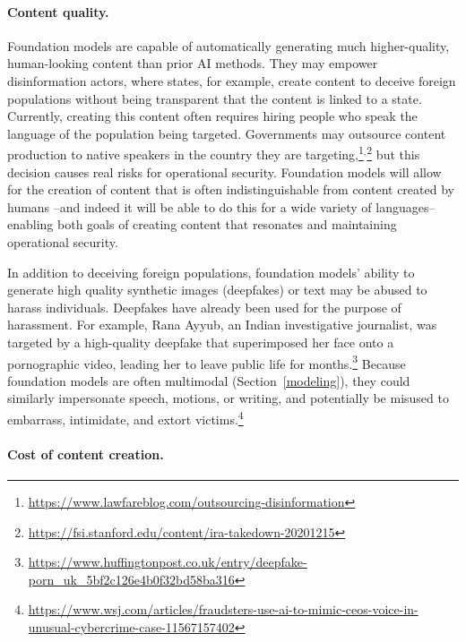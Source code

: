 \paragraph{Content quality.} Foundation models are capable of automatically generating much higher-quality, human-looking content than prior AI methods. They may empower disinformation actors, where states, for example, create content to deceive foreign populations without being transparent that the content is linked to a state. Currently, creating this content often requires hiring people who speak the language of the population being targeted. Governments may outsource content production to native speakers in the country they are targeting,\footnote{\url{https://www.lawfareblog.com/outsourcing-disinformation}}$^{,}$\footnote{ \url{https://fsi.stanford.edu/content/ira-takedown-20201215}} but this decision causes real risks for operational security. Foundation models will allow for the creation of content that is often indistinguishable from content created by humans \citep{kreps_mccain_brundage_2020, clark2021all}--and indeed it will be able to do this for a wide variety of languages--enabling both goals of creating content that resonates and maintaining operational security. 

In addition to deceiving foreign populations, foundation models’ ability to generate high quality synthetic images (deepfakes) or text may be abused to harass individuals. Deepfakes have already been used for the purpose of harassment. For example, Rana Ayyub, an Indian investigative journalist, was targeted by a high-quality deepfake that superimposed her face onto a pornographic video, leading her to leave public life for months.\footnote{\url{ https://www.huffingtonpost.co.uk/entry/deepfake-porn_uk_5bf2c126e4b0f32bd58ba316}} Because foundation models are often multimodal (Section~\ref{modeling}), they could similarly impersonate speech, motions, or writing, and potentially be misused to embarrass, intimidate, and extort victims.\footnote{\href{https://www.wsj.com/articles/fraudsters-use-ai-to-mimic-ceos-voice-in-unusual-cybercrime-case-11567157402}{{ https://www.wsj.com/articles/fraudsters-use-ai-to-mimic-ceos-voice-in-unusual-cybercrime-case-11567157402}}}

\paragraph{Cost of content creation.}

